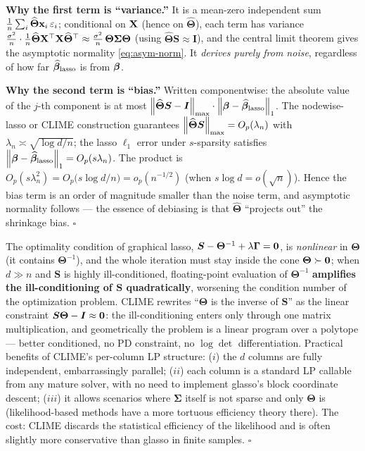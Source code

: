 \begin{description}[style=nextline, itemsep=1.2ex]
\textbf{Why the first term is ``variance.''} It is a mean-zero independent sum $\frac{1}{n}\sum_i \widehat{\bm{\Theta}}\mathbf{x}_i\,\varepsilon_i$; conditional on $\mathbf{X}$ (hence on $\widehat{\bm{\Theta}}$), each term has variance $\frac{\sigma^2}{n}\cdot\frac{1}{n}\widehat{\bm{\Theta}}\mathbf{X}^\top\mathbf{X}\widehat{\bm{\Theta}}^\top \approx \frac{\sigma^2}{n}\,\bm{\Theta}\bm{\Sigma}\bm{\Theta}$ (using $\widehat{\bm{\Theta}}\bm{S} \approx \bm{I}$), and the central limit theorem gives the asymptotic normality \eqref{eq:asym-norm}. It \textit{derives purely from noise}, regardless of how far $\widehat{\bm{\beta}}_{\mathrm{lasso}}$ is from $\bm{\beta}$.

\textbf{Why the second term is ``bias.''} Written componentwise: the absolute value of the $j$-th component is at most $\left\lVert \widehat{\bm{\Theta}}\bm{S} - \bm{I} \right\rVert_{\max} \cdot \left\lVert \bm{\beta} - \widehat{\bm{\beta}}_{\mathrm{lasso}} \right\rVert_1$. The nodewise-lasso or CLIME construction guarantees $\left\lVert \widehat{\bm{\Theta}}\bm{S} \right\rVert_{\max} = O_p(\lambda_n)$ with $\lambda_n \asymp \sqrt{\log d / n}$; the lasso $\ell_1$ error under $s$-sparsity satisfies $\left\lVert \bm{\beta} - \widehat{\bm{\beta}}_{\mathrm{lasso}} \right\rVert_1 = O_p(s\lambda_n)$. The product is $O_p(s\lambda_n^2) = O_p\big(s\log d / n\big) = o_p(n^{-1/2})$ (when $s\log d = o(\sqrt{n})$). Hence the bias term is an order of magnitude smaller than the noise term, and asymptotic normality follows --- the essence of debiasing is that $\widehat{\bm{\Theta}}$ ``projects out'' the shrinkage bias. $\square$

\item[Exercise \ref{ex:glasso-clime} (points for discussion)]
The optimality condition of graphical lasso, $\bm{S} - \bm{\Theta}^{-1} + \lambda\bm{\Gamma} = \mathbf{0}$, is \textit{nonlinear} in $\bm{\Theta}$ (it contains $\bm{\Theta}^{-1}$), and the whole iteration must stay inside the cone $\bm{\Theta} \succ \mathbf{0}$; when $d \gg n$ and $\bm{S}$ is highly ill-conditioned, floating-point evaluation of $\bm{\Theta}^{-1}$ \textbf{amplifies the ill-conditioning of $\bm{S}$ quadratically}, worsening the condition number of the optimization problem. CLIME rewrites ``$\bm{\Theta}$ is the inverse of $\bm{S}$'' as the linear constraint $\bm{S}\bm{\Theta} - \bm{I} \approx \mathbf{0}$: the ill-conditioning enters only through one matrix multiplication, and geometrically the problem is a linear program over a polytope --- better conditioned, no PD constraint, no $\log\det$ differentiation. Practical benefits of CLIME's per-column LP structure: ($i$) the $d$ columns are fully independent, embarrassingly parallel; ($ii$) each column is a standard LP callable from any mature solver, with no need to implement glasso's block coordinate descent; ($iii$) it allows scenarios where $\bm{\Sigma}$ itself is not sparse and only $\bm{\Theta}$ is (likelihood-based methods have a more tortuous efficiency theory there). The cost: CLIME discards the statistical efficiency of the likelihood and is often slightly more conservative than glasso in finite samples. $\square$
\end{description}

